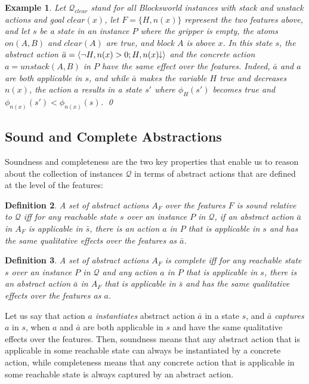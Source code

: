 \documentclass[letterpaper]{article} %
\newcommand{\tup}[1]{\langle #1 \rangle}
\newtheorem{definition}{Definition}
\newtheorem{example}[definition]{Example}
\newcommand{\Q}{\mathcal{Q}}
\newcommand{\abst}[2]{\tup{#1;#2}}
\newcommand{\mminus}{\hspace{-.05em}\raisebox{.15ex}{\footnotesize$\downarrow$}}
\begin{document}
\begin{example}
Let $\Q_{clear}$ stand for  all  Blocksworld instances with stack and unstack actions and goal $clear(x)$,
let $F=\{H,n(x)\}$   represent the two features above, and let $s$ be a state in an instance $P$
where the gripper is empty, the atoms $on(A,B)$ and $clear(A)$ are true, and block $A$ is above
$x$. In this state $s$,
the abstract action $\bar{a}=\abst{\neg H,n(x)>0}{H,n(x)\mminus}$
and the concrete  action   $a=unstack(A,B)$ in $P$ have the same effect over the features.
Indeed, $\bar{a}$ and $a$  are both applicable in $s$, and while $\bar{a}$ makes the variable $H$ true and decreases
$n(x)$, the action $a$ results in a state $s'$ where $\phi_{H}(s')$ becomes true and $\phi_{n(x)}(s') < \phi_{n(x)}(s)$. \qed
\end{example}


\subsection{Sound and Complete Abstractions}

Soundness and completeness are the two key  properties that  enable us to reason about the collection of
instances $\Q$ in terms of abstract actions that are defined at the level of the features:

\begin{definition}
A set of abstract actions $A_F$ over the features $F$ is \emph{sound} relative to 
$\Q$ iff for any reachable state $s$ over an   instance $P$ in $\Q$,
if an abstract action $\bar{a}$ in $A_F$ is applicable in $\bar{s}$,
there is an  action $a$ in $P$ that is applicable in $s$ and
has the \emph{same qualitative effects} over the features as $\bar{a}$.
\end{definition}

\begin{definition}
A set of abstract actions $A_F$ is \emph{complete} iff for any
reachable state $s$ over an instance $P$ in $\Q$ and any  action $a$
in $P$ that is applicable in $s$, there is an abstract action $\bar{a}$ in
$A_F$ that is applicable in $\bar{s}$ and  has the \emph{same qualitative
effects over the features as $a$.}
\end{definition}

Let us say that  action $a$ \emph{instantiates} abstract action $\bar{a}$ in a state $s$,
and $\bar{a}$ \emph{captures} $a$ in $s$,  when $a$ and $\bar{a}$ are both applicable in $s$ and have the same qualitative effects over the features.
Then, soundness means that any abstract action that is applicable in some reachable state can
always be instantiated by a concrete action, while completeness  means that any concrete action that is applicable in some reachable state 
is always captured by an abstract action.  
\end{document}
